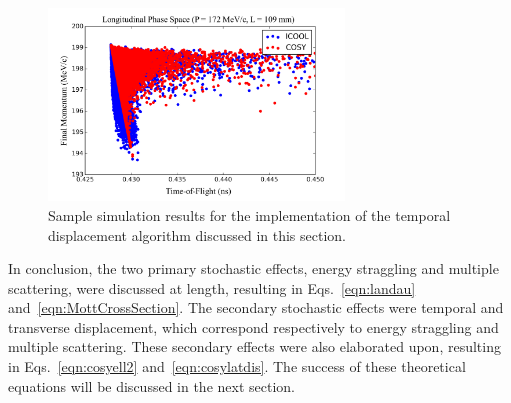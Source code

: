 \begin{figure}[H]
  \centering
    \includegraphics[width=0.7\textwidth]{Figures/longitudinal_phase_space} 
  \caption{Sample simulation results for the implementation of the temporal displacement algorithm discussed in this section.}
  \label{fig:longitudinal_phase_space}
\end{figure}

In conclusion, the two primary stochastic effects, energy straggling and multiple scattering, were discussed at length, resulting in Eqs.~\eqref{eqn:landau} and~\eqref{eqn:MottCrossSection}. The secondary stochastic effects were temporal and transverse displacement, which correspond respectively to energy straggling and multiple scattering. These secondary effects were also elaborated upon, resulting in Eqs.~\eqref{eqn:cosyell2} and~\eqref{eqn:cosylatdis}. The success of these theoretical equations will be discussed in the next section.
